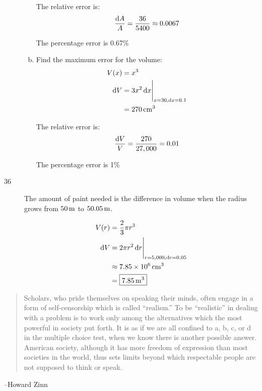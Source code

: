 \documentclass[letterpaper, landscape]{exam}
\newcommand{\dx}{\dif x}
\begin{document}
\begin{description}
\begin{enumerate}[(a)]
          The relative error is:
          \[
            \frac{\dif A}{A} = \frac{36}{5400} \approx 0.0067 \\
          \]

          The percentage error is 0.67\%

        \item 
          Find the maximum error for the volume:
          \begin{align*}
            V(x)   & = x^3 \\
            \dif V & = \eval{ 3x^2 \dx }_{x = 30, \dx = 0.1} \\
                   & = \unit[270]{cm^3} \\
          \end{align*}

          The relative error is:
          \[
            \frac{\dif V}{V} = \frac{270}{27,000} = 0.01 \\
          \]

          The percentage error is 1\%

      \end{enumerate}

    \newpage

    \item[36]
      The amount of paint needed is the difference in volume when the radius grows from 
      $\unit[50]{m}$ to $\unit[50.05]{m}$.

      \begin{align*}
        V(r)   & = \frac{2}{3} \pi r^3 \\
        \dif V & = \eval{ 2 \pi r^2 \dif r }_{r = 5,000, \dif r = 0.05 } \\
               & \approx \unit[7.85 \times 10^6]{cm^3} \\
               & = \boxed{ \unit[7.85]{m^3} } \\
      \end{align*}

  \end{description}

  \else
    \vspace{9 cm}
    \begin{quote}
      \begin{em}
        Scholars, who pride themselves on speaking their minds, often engage in a form of
        self-censorship which is called ``realism.'' To be ``realistic'' in dealing with a problem
        is to work only among the alternatives which the most powerful in society put forth. It is
        as if we are all confined to a, b, c, or d in the multiple choice test, when we know there
        is another possible answer. American society, although it has more freedom of expression
        than most societies in the world, thus sets limits beyond which respectable people are not
        supposed to think or speak.
      \end{em}
    \end{quote}
    \hspace{2 cm} --Howard Zinn
  \fi
\end{document}
